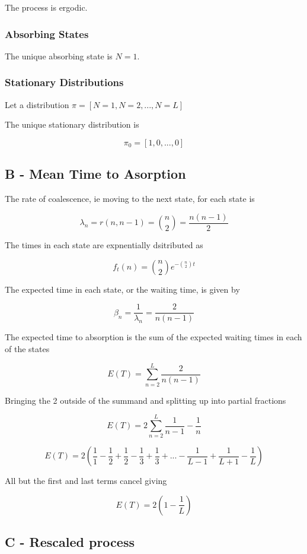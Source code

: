 \documentclass{article}
\begin{document}
The process is ergodic.

\subsubsection{Absorbing States}

The unique absorbing state is $N = 1$.

\subsubsection{Stationary Distributions}

Let a distribution $\pi = [N=1, N=2,... ,N=L]$

The unique stationary distribution is 

$$\pi_0 = [1,0,...,0]$$

\subsection{B - Mean Time to Asorption}

The rate of coalescence, ie moving to the next state, for each state is

$$\lambda_n = r(n,n-1) = {n\choose 2} = \frac{n(n-1)}{2}$$

The times in each state are expnentially dsitributed as

$$f_t(n) = {n \choose 2} e^{-{n \choose 2}t}$$

The expected time in each state, or the waiting time, is given by 

$$\beta_n = \dfrac{1}{\lambda_n} = \frac{2}{n(n-1)}$$

The expected time to absorption is the sum of the expected waiting times in each of the states

$$E(T) = \sum_{n=2}^L\frac{2}{n(n-1)}$$

Bringing the 2 outside of the summand and splitting up into partial fractions

$$E(T) = 2\sum_{n=2}^L\frac{1}{n-1} - \frac{1}{n}$$


$$E(T) = 2(\frac{1}{1}-\frac{1}{2}+\frac{1}{2}-\frac{1}{3} + \frac{1}{3} + ... - \frac{1}{L-1} + \frac{1}{L+1} - \frac{1}{L})$$

All but the first and last terms cancel giving

$$E(T) = 2(1 - \frac{1}{L})$$


\subsection{C - Rescaled process}
\end{document}
